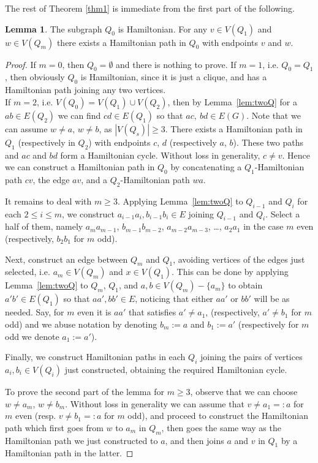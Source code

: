 \documentclass{amsart}
\theoremstyle{definition}
\newtheorem{lemma}{Lemma}
\begin{document}
The rest of Theorem \ref{thm1} is immediate from the first part of the following.
\begin{lemma}\label{lem:Q0H}
The subgraph $Q_0$ is Hamiltonian. 
For any $v\in V(Q_1)$ and $w\in V(Q_m)$ there exists a Hamiltonian
path in $Q_0$ with endpoints $v$ and $w$.
\end{lemma} 
\begin{proof}
If $m=0$, then $Q_0=\emptyset$ and there is nothing to prove.
If $m=1$, i.e. $Q_0=Q_1$, then obviously $Q_0$ is Hamiltonian, since it is just a clique, and
has a Hamiltonian path joining any two vertices.\\
If $m=2$, i.e. $V(Q_0)=V(Q_1)\cup V(Q_2)$, then by Lemma~\ref{lem:twoQ} 
for a $ab\in E(Q_2)$
we can find $cd\in E(Q_1)$ so that $ac,~bd\in E(G)$. 
Note that we can assume $w\neq a$, $w\neq b$, as $|V(Q_s)|\geq 3$.
There exists a Hamiltonian path in  $Q_1$ (respectively in $Q_2$) 
with endpoints $c$, $d$ (respectively $a$, $b$).
These two paths and $ac$ and $bd$ form a Hamiltonian cycle.
Without loss in generality, $c\neq v$. Hence we can construct a
Hamiltonian path in $Q_0$ by concatenating a $Q_1$-Hamiltonian
path $cv$, the  edge $av$, and a $Q_2$-Hamiltonian path $wa$.
 
It remains to deal with $m\geq 3$.
Applying Lemma~\ref{lem:twoQ} to $Q_{i-1}$ and $Q_i$ for each $2\leq i\leq m$, 
we construct $a_{i-1}a_i, b_{i-1}b_i\in E$ joining $Q_{i-1}$ and $Q_i$.
Select a half of them, namely $a_{m}a_{m-1}$, $b_{m-1}b_{m-2}$, $a_{m-2}a_{m-3}$, \dots,
$a_2a_1$ in the case $m$ even (respectively, $b_2b_1$ for $m$ odd).

Next, construct an edge between $Q_m$ and $Q_1$, avoiding vertices of the edges just
selected, i.e. $a_m\in V(Q_m)$ and $x\in V(Q_1)$. 
This can be done by applying Lemma~\ref{lem:twoQ} to $Q_m$, $Q_1$, 
and $a,b\in V(Q_m)-\{a_m\}$ to obtain $a'b'\in E(Q_1)$ so that $aa',bb'\in E$, 
noticing that either $aa'$ or $bb'$ will be as needed. Say, for $m$ even 
it is $aa'$
that satisfies $a'\neq a_1$, (respectively, $a'\neq b_1$ for $m$ odd)  and we 
abuse notation by denoting $b_m:=a$ and $b_1:=a'$ (respectively for $m$ odd 
we denote $a_1:=a'$).

Finally, we construct Hamiltonian paths in each $Q_i$ joining the pairs of vertices
$a_i,b_i\in V(Q_i)$ just constructed, obtaining the required Hamiltonian cycle.

To prove the second part of the lemma for $m\geq 3$, observe that we can choose
$w\neq a_m$, $w\neq b_m$. Without loss in generality we can assume that $v\neq a_1=:a$ 
for $m$ even (resp. $v\neq b_1=:a$ for $m$ odd), 
and proceed to construct the Hamiltonian path
which first goes from $w$ to $a_m$ in $Q_m$, then goes the same way as the Hamiltonian
path we just constructed to $a$, and then joins $a$ and $v$ in $Q_1$ by a Hamiltonian path 
in the latter.
\end{proof}
\end{document}
